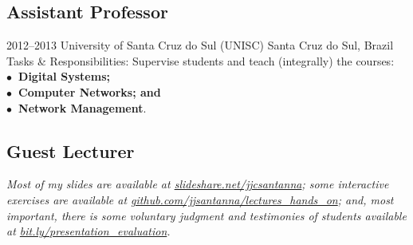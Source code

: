\documentclass[print]{styles/friggeri-cv-mac} %
\begin{document}
\subsection{Assistant Professor}\vspace{-5pt}
\begin{entrylist}
\entry
{2012--2013}
{University of Santa Cruz do Sul (UNISC)}
{Santa Cruz do Sul, Brazil}
{Tasks \& Responsibilities: Supervise students and teach (integrally) the courses: \\
	\textbf{$\bullet$~Digital Systems;\\$\bullet$~Computer Networks; and\\$\bullet$~Network Management}.} 
\end{entrylist}

\newpage
\subsection{Guest Lecturer}\vspace{-5pt}

\textit{Most of my slides are available at
\href{http://www.slideshare.net/jjcsantanna}{slideshare.net/jjcsantanna}; some
interactive exercises are available at
\href{https://github.com/jjsantanna/lectures_hands_on}{github.com/jjsantanna/lectures\_hands\_on};
and, most important, there is some voluntary judgment and testimonies of students
available at
\href{http://bit.ly/presentation_evaluation}{bit.ly/presentation\_evaluation}.}
\end{document}

